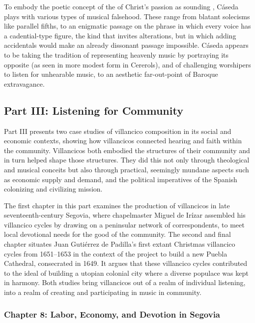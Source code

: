 \documentclass[tt]{vcbook-proposal}
\begin{document}
To embody the poetic concept of the  of Christ's passion as sounding , Cáseda plays with various types of musical falsehood.
These range from blatant solecisms like parallel fifths, to an enigmatic passage on the phrase  in which every voice has a cadential-type figure, the kind that invites  alterations, but in which adding accidentals would make an already dissonant passage impossible.
Cáseda appears to be taking the tradition of representing heavenly music by portraying its opposite (as seen in more modest form in Cererols), and of challenging worshipers to listen for unhearable music, to an aesthetic far-out-point of Baroque extravagance.



\subsection{Part III: Listening for Community}

Part III presents two case studies of villancico composition in its social and economic contexts, showing how villancicos connected hearing and faith within the community.
Villancicos both embodied the structures of their community and in turn helped shape those structures.
They did this not only through theological and musical conceits but also through practical, seemingly mundane aspects such as economic supply and demand, and the political imperatives of the Spanish colonizing and civilizing mission.

The first chapter in this part examines the production of villancicos in late seventeenth-century Segovia, where chapelmaster Miguel de Irízar assembled his villancico cycles by drawing on a peninsular network of correspondents, to meet local devotional needs for the good of the community.
The second and final chapter situates Juan Gutiérrez de Padilla's first extant Christmas villancico cycles from 1651--1653 in the context of the project to build a new Puebla Cathedral, consecrated in 1649.
It argues that these villancico cycles contributed to the ideal of building a utopian colonial city where a diverse populace was kept in harmony.
Both studies bring villancicos out of a realm of individual listening, into a realm of creating and participating in music in community.

\subsubsection{Chapter 8: Labor, Economy, and Devotion in Segovia}
\end{document}
